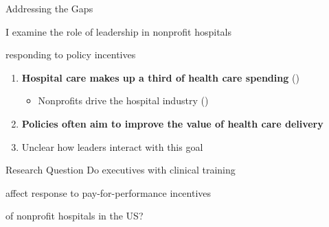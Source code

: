 \documentclass[notes,11pt, aspectratio=169]{beamer}
\newenvironment{wideitemize}{\itemize\addtolength{\itemsep}{10pt}}{\enditemize}
\begin{document}
\begin{frame}{Addressing the Gaps}

    \Large
    \begin{block}{}
    \begin{center}
    I examine the role of leadership in nonprofit hospitals
    
    responding to policy incentives
    \end{center}
    \end{block}


\vspace{5mm} \large \pause

\begin{enumerate}
    \item \textbf{Hospital care makes up a third of health care spending} \scriptsize (\cite{cms2024nhe}) \normalsize

\vspace{2mm}
    
    \begin{itemize}
        \item \normalsize Nonprofits drive the hospital industry \scriptsize (\cite{ASPE_2023}) \normalsize
    \end{itemize}

\vspace{8mm}

    \item \large \textbf{Policies often aim to improve the value of health care delivery}

\vspace{2mm}

    \begin{wideitemize}
        \item \normalsize Unclear how leaders interact with this goal
    \end{wideitemize}

    \end{enumerate}
\end{frame}

\begin{frame}{Research Question}
    \centering
    \Large
    Do executives with clinical training 

    \vspace{1mm}
    
    affect response to pay-for-performance incentives 

    \vspace{1mm}
    
    of nonprofit hospitals in the US?
\end{frame}
\end{document}
